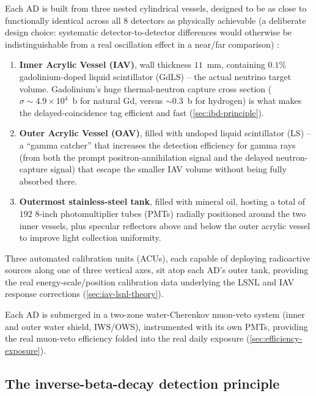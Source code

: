 \begin{theorybox}
Each AD is built from three nested cylindrical vessels, designed to be as
close to functionally identical across all 8 detectors as physically
achievable (a deliberate design choice: systematic detector-to-detector
differences would otherwise be indistinguishable from a real oscillation
effect in a near/far comparison) \parencite{An2017DayaBayFluxSpectrum}:
\begin{enumerate}
  \item \textbf{Inner Acrylic Vessel (IAV)}, wall thickness $11$~mm,
    containing $0.1\%$ gadolinium-doped liquid scintillator (GdLS) --
    the actual neutrino target volume. Gadolinium's huge thermal-neutron
    capture cross section ($\sigma\sim 4.9\times10^4$~b for natural Gd,
    versus $\sim0.3$~b for hydrogen) is what makes the delayed-coincidence
    tag efficient and fast (\cref{sec:ibd-principle}).
  \item \textbf{Outer Acrylic Vessel (OAV)}, filled with undoped liquid
    scintillator (LS) -- a ``gamma catcher'' that increases the detection
    efficiency for gamma rays (from both the prompt positron-annihilation
    signal and the delayed neutron-capture signal) that escape the smaller
    IAV volume without being fully absorbed there.
  \item \textbf{Outermost stainless-steel tank}, filled with mineral oil,
    hosting a total of $192$ 8-inch photomultiplier tubes (PMTs) radially
    positioned around the two inner vessels, plus specular reflectors above
    and below the outer acrylic vessel to improve light collection
    uniformity.
\end{enumerate}
Three automated calibration units (ACUs), each capable of deploying
radioactive sources along one of three vertical axes, sit atop each AD's
outer tank, providing the real energy-scale/position calibration data
underlying the LSNL and IAV response corrections
(\cref{sec:iav-lsnl-theory}).

Each AD is submerged in a two-zone water-Cherenkov muon-veto system (inner
and outer water shield, IWS/OWS), instrumented with its own PMTs, providing
the real muon-veto efficiency folded into the real daily
 exposure (\cref{sec:efficiency-exposure}).
\end{theorybox}

\subsection*{The inverse-beta-decay detection principle}
\label{sec:ibd-principle}

